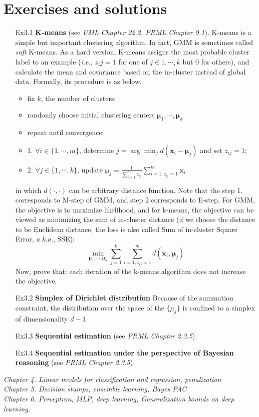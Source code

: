 \documentclass{article}
\begin{document}
\section{Exercises and solutions}
\begin{itemize}
\item[Ex3.1] \textbf{K-means} (see \textit{UML Chapter 22.2, PRML Chapter 9.1}). K-means is a simple but important clustering algorithm. In fact, GMM is sometimes called \textit{soft} K-means. As a hard version, K-means assigns the most probable cluster label to an example (\textit{i.e.}, $z_ij=1$ for one of $j\in{1,\cdots,k}$ but 0 for others), and calculate the mean and covariance based on the in-cluster instead of global data. Formally, its procedure is as below,

	\begin{shaded}
    \begin{itemize}
	\item fix $k$, the number of clusters;
	\item randomly choose initial clustering centers $\bm{\mu}_1,\cdots,\bm{\mu}_k$
	\item repeat until convergence:
	\item 1. $\forall i\in \{1,\cdots,m\}$, determine $j=\arg\min_{j} d(\bm{x}_i-\bm{\mu}_j)$ and set $z_{ij}=1$;
	\item 2. $\forall j\in \{1,\cdots,k\}$, update $\bm{\mu}_j = \frac{1}{\sum_{i=1}^m z_{ij}} \sum_{i=1,z_{ij}=1}^m \bm{x}_i$
	\end{itemize}
  	\end{shaded}
in which $d(\cdot,\cdot)$ can be arbitrary distance function. Note that the step 1. corresponds to M-step of GMM, and step 2 corresponds to E-step. For GMM, the objective is to maximize likelihood, and for k-means, the objective can be viewed as minimizing the sum of in-cluster distance (if we choose the distance to be Euclidean distance, the loss is also called Sum of in-cluster Square Error, \textit{a.k.a.}, SSE):
	\begin{equation*}
	\min_{\bm{\mu}_1,\cdots,\bm{\mu}_k} \sum_{j=1}^k \sum_{i=1, z_{ij}=1}^m d(\bm{x}_i, \bm{\mu}_j)
	\end{equation*}
Now, prove that: each iteration of the k-means algorithm does not increase the objective.

\item[Ex3.2] \textbf{Simplex of Dirichlet distribution} Because of the summation constraint, the distribution over the space of the $\{\mu_j\}$ is confined to a simplex of dimensionality $d-1$.

\item[Ex3.3] \textbf{Sequential estimation} (see \textit{PRML Chapter 2.3.5}).

\item[Ex3.4] \textbf{Sequential estimation under the perspective of Bayesian reasoning} (see \textit{PRML Chapter 2.3.5}).


\end{itemize}
\textit{
	Chapter 4. Linear models for classification and regression, penalization \\
	  Chapter 5. Decision stumps, ensemble learning, Bayes PAC \\
      Chapter 6. Perceptron, MLP, deep learning, Generalization bounds on deep learning.}
\end{document}
